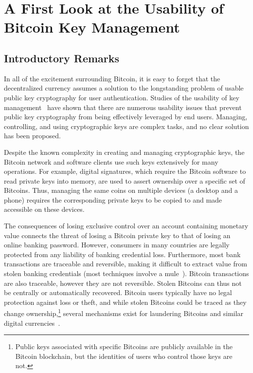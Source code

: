 


\chapter{A First Look at the Usability of Bitcoin Key Management}


\section{Introductory Remarks}

In all of the excitement surrounding Bitcoin, it is easy to forget that the decentralized currency assumes a solution to the longstanding problem of usable public key cryptography for user authentication. Studies of the usability of key management~\cite{GM05,GMSN+05,SBKH06,GFF06} have shown that there are numerous usability issues that prevent public key cryptography from being effectively leveraged by end users. Managing, controlling, and using cryptographic keys are complex tasks, and no clear solution has been proposed.  

Despite the known complexity in creating and managing cryptographic keys, the Bitcoin network and software clients use such keys extensively for many operations. For example, digital signatures, which require the Bitcoin software to read private keys into memory, are used to assert ownership over a specific set of Bitcoins. Thus, managing the same coins on multiple devices (\eg a desktop and a phone) requires the corresponding private keys to be copied to and made accessible on these devices. 


The consequences of losing exclusive control over an account containing monetary value connects the threat of losing a Bitcoin private key to that of losing an online banking password. However, consumers in many countries are legally protected from any liability of banking credential loss. Furthermore, most bank transactions are traceable and reversible, making it difficult to extract value from stolen banking credentials (most techniques involve a mule~\cite{FH12}). Bitcoin transactions are also traceable, however they are not reversible. Stolen Bitcoins can thus not be centrally or automatically recovered. Bitcoin users typically have no legal protection against loss or theft, and while stolen Bitcoins could be traced as they change ownership,\footnote{Public keys associated with specific Bitcoins are publicly available in the Bitcoin blockchain, but the identities of users who control those keys are not.} several mechanisms exist for laundering Bitcoins and similar digital currencies~\cite{MGGR13,BNMC+14}.

